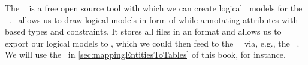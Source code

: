 %
%
\label{sec:installingPgModeler}%
%
The \pgmodeler~\cite{AES2006PPDM} is a free open source tool with which we can create logical \db\ models for the \dbms\ \postgresql.
\pgmodeler\ allows us to draw logical models in form of  while annotating attributes with \sql-based types and constraints.
It stores all files in an  format and allows us to export our logical models to \sql, which we could then feed to the \postgresql\ \dbms\ via, e.g., the \psql\ .
We will use the \pgmodeler\ in \cref{sec:mappingEntitiesToTables} of this book, for instance.%
%
%
%
%
\endhsection%
%
